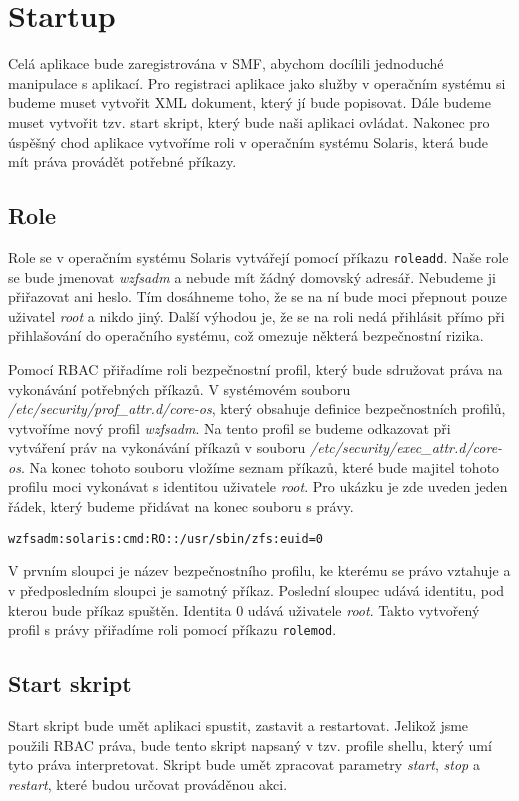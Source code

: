 \section{Startup}
Celá aplikace bude zaregistrována v SMF, abychom docílili jednoduché manipulace s aplikací. Pro registraci aplikace jako služby v operačním systému si budeme muset vytvořit XML dokument, který jí bude popisovat. Dále budeme muset vytvořit tzv. start skript, který bude naši aplikaci ovládat. Nakonec pro úspěšný chod aplikace vytvoříme roli v operačním systému Solaris, která bude mít práva provádět potřebné příkazy.
\subsection{Role}
Role se v operačním systému Solaris vytvářejí pomocí příkazu \verb|roleadd|. Naše role se bude jmenovat \emph{wzfsadm} a nebude mít žádný domovský adresář. Nebudeme ji přiřazovat ani heslo. Tím dosáhneme toho, že se na ní bude moci přepnout pouze uživatel \emph{root} a nikdo jiný. Další výhodou je, že se na roli nedá přihlásit přímo při přihlašování do operačního systému, což omezuje některá bezpečnostní rizika.

Pomocí RBAC přiřadíme roli bezpečnostní profil, který bude sdružovat práva na vykonávání potřebných příkazů. V systémovém souboru \emph{/etc/\-se\-cu\-ri\-ty/\-prof\_attr.d/\-core-os}, který obsahuje definice bezpečnostních profilů, vytvoříme nový profil \emph{wzfsadm}. Na tento profil se budeme odkazovat při vytváření práv na vykonávání příkazů v souboru \emph{/etc/\-se\-cu\-ri\-ty/\-exec\_attr.d/\-core-os}. Na konec tohoto souboru vložíme seznam příkazů, které bude majitel tohoto profilu moci vykonávat s identitou uživatele \emph{root}. Pro ukázku je zde uveden jeden řádek, který budeme přidávat na konec souboru s právy.
\begin{verbatim}
wzfsadm:solaris:cmd:RO::/usr/sbin/zfs:euid=0
\end{verbatim}
V prvním sloupci je název bezpečnostního profilu, ke kterému se právo vztahuje a v předposledním sloupci je samotný příkaz. Poslední sloupec udává identitu, pod kterou bude příkaz spuštěn. Identita 0 udává uživatele \emph{root}. Takto vytvořený profil s právy přiřadíme roli pomocí příkazu \verb|rolemod|.
\subsection{Start skript}
Start skript bude umět aplikaci spustit, zastavit a restartovat. Jelikož jsme použili RBAC práva, bude tento skript napsaný v tzv. profile shellu, který umí tyto práva interpretovat. Skript bude umět zpracovat parametry \emph{start}, \emph{stop} a \emph{restart}, které budou určovat prováděnou akci.

